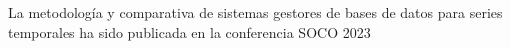 
La metodología y comparativa de sistemas gestores de bases de datos para series temporales 
ha sido publicada en la conferencia SOCO 2023


